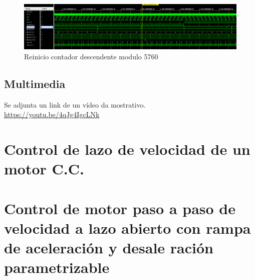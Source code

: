 \documentclass[11pt, a4paper]{article}
\begin{document}
		\begin{figure}[H]
			\centering
			\includegraphics[width=\textwidth]{Imagenes/sim_down.png}
			\caption{Reinicio contador descendente modulo 5760}
			\label{fig:cont_down}
		\end{figure} 

		\subsection{Multimedia}
		Se adjunta un link de un vídeo da mostrativo. \\
		\url{https://youtu.be/4qJg4IgcLNk}
	\section{Control de lazo de velocidad de un motor C.C.}
	\section{Control de motor paso a paso de velocidad a lazo abierto con rampa de aceleración y desale ración parametrizable}
\end{document}
